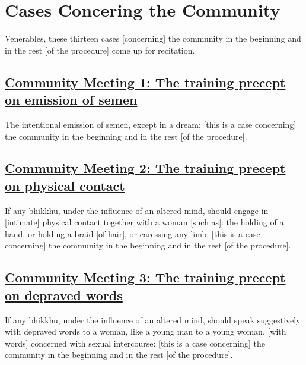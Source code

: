 
\section{Cases Concering the Community}
\label{comm}

\begin{intro}
	Venerables, these thirteen cases [concerning] the community in the beginning and in the rest [of the procedure] come up for recitation.
\end{intro}

\subsection*{\hyperref[sd1]{Community Meeting 1: The training precept on emission of semen}}
\label{comm1}

The intentional emission of semen, except in a dream: [this is a case concerning] the community in the beginning and in the rest [of the procedure].



\subsection*{\hyperref[sd2]{Community Meeting 2: The training precept on physical contact}}
\label{comm2}

If any bhikkhu, under the influence of an altered mind, should engage in [intimate] physical contact together with a woman [such as]: the holding of a hand, or holding a braid [of hair], or caressing any limb: [this is a case concerning] the community in the beginning and in the rest [of the procedure].



\subsection*{\hyperref[sd3]{Community Meeting 3: The training precept on depraved words}}
\label{comm3}

If any bhikkhu, under the influence of an altered mind, should speak suggestively with depraved words to a woman, like a young man to a young woman, [with words] concerned with sexual intercourse: [this is a case concerning] the community in the beginning and in the rest [of the procedure].



